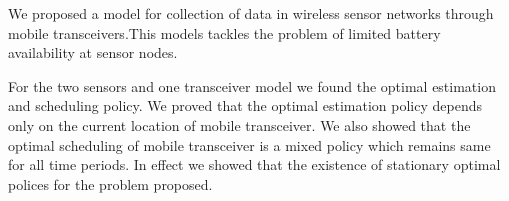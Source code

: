 \documentclass[a4paper,english,12pt]{article}
\begin{document}
We proposed a model for collection of data in wireless sensor networks through mobile transceivers.This  models tackles the problem of limited battery availability at sensor nodes.

For the two sensors and one transceiver model we found the optimal estimation and scheduling policy. We proved that the optimal estimation policy depends only on the current location of mobile transceiver. We also showed that the optimal scheduling of mobile transceiver is a mixed policy which remains same for all time periods. In effect we showed that the existence of stationary optimal polices for the problem proposed.




\end{document}
